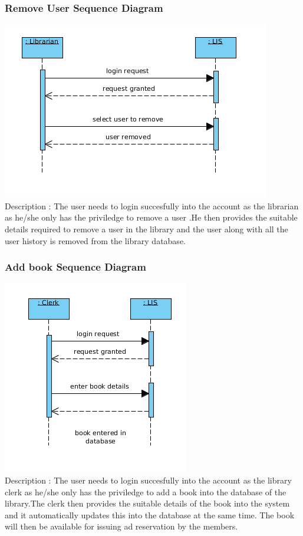\documentclass{article}
\begin{document}
\subsubsection*{Remove User Sequence Diagram}
\includegraphics[scale=0.50]{images/seqDiagRemoveUser.png}
\\
Description : The user needs to login succesfully into the account as the librarian as he/she only has the priviledge to remove a user .He then provides the suitable details required to remove a user in the library and the user along with all the user history is removed from the library database.
\\

\subsubsection*{Add book Sequence Diagram}
\includegraphics[scale=0.50]{images/seqDiagAddBook.png}
\\
Description : The user needs to login succesfully into the account as the library clerk as he/she only has the priviledge to add a book into the database of the library.The clerk then provides the suitable details of the book into the system and it automatically updates this into the database at the same time. The book will then be available for issuing ad reservation by the members.
\\
\end{document}
